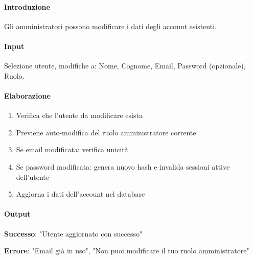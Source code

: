 \begin{reqbox}[title=REQ-FUN-22: Modifica Utenze (solo Admin)]
\label{subsubsec:req-modifica-utenze}

\paragraph{Introduzione}
Gli amministratori possono modificare i dati degli account esistenti.

\paragraph{Input}
Selezione utente, modifiche a: Nome, Cognome, Email, Password (opzionale), Ruolo.

\paragraph{Elaborazione}
\begin{enumerate}[leftmargin=1.1em]
\item Verifica che l'utente da modificare esista
\item Previene auto-modifica del ruolo amministratore corrente
\item Se email modificata: verifica unicità
\item Se password modificata: genera nuovo hash e invalida sessioni attive dell'utente
\item Aggiorna i dati dell'account nel database
\end{enumerate}

\paragraph{Output}
\textbf{Successo}: "Utente aggiornato con successo"

\textbf{Errore}: "Email già in uso", "Non puoi modificare il tuo ruolo amministratore"

\end{reqbox}

\vspace{0.5cm}

\newpage


